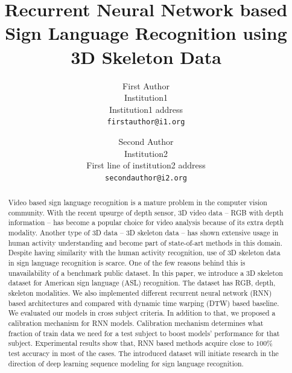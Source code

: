 \documentclass[10pt,twocolumn,letterpaper]{article}
\begin{document}
\title{Recurrent Neural Network based Sign Language Recognition using 3D Skeleton Data}

\author{First Author\\
Institution1\\
Institution1 address\\
{\tt\small firstauthor@i1.org}
\and
Second Author\\
Institution2\\
First line of institution2 address\\
{\tt\small secondauthor@i2.org}
}

\maketitle

\begin{abstract}
Video based sign language recognition is a mature problem in the computer vision community. With the recent upsurge of depth sensor, 3D video data -- RGB with depth information -- has become a popular choice for video analysis because of its extra depth modality. Another type of 3D data -- 3D skeleton data -- has shown extensive usage in human activity understanding and become part of state-of-art methods in this domain. Despite having similarity with the human activity recognition, use of 3D skeleton data in sign language recognition is scarce. One of the few reasons behind this is unavailability of a benchmark public dataset. In this paper, we introduce a 3D skeleton dataset for American sign language (ASL) recognition. The dataset has RGB, depth, skeleton modalities. We also implemented different recurrent neural network (RNN) based architectures and compared with dynamic time warping (DTW) based baseline. We evaluated our models in cross subject criteria. In addition to that, we proposed a calibration mechanism for RNN models. Calibration mechanism determines what fraction of train data we need for a test subject to boost models' performance for that subject. Experimental results show that, RNN based methods acquire close to $100\%$ test accuracy in most of the cases. The introduced dataset will initiate research in the direction of deep learning sequence modeling for sign language recognition. 
\end{abstract}
\end{document}
